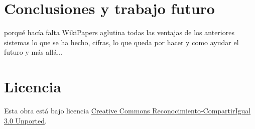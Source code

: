\documentclass[11pt,onecolumn]{article}
\begin{document}
\section{Conclusiones y trabajo futuro}
porqué hacía falta WikiPapers
aglutina todas las ventajas de los anteriores sistemas
lo que se ha hecho, cifras,
lo que queda por hacer y como ayudar
el futuro y más allá...



        


\section{Licencia}
Esta obra está bajo licencia \href{http://creativecommons.org/licenses/by-sa/3.0/}{Creative Commons Reconocimiento-CompartirIgual 3.0 Unported}.
\end{document}
